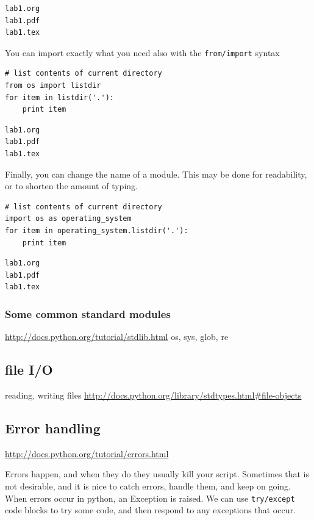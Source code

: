\documentclass[11pt]{article}
\begin{document}
\begin{verbatim}
lab1.org
lab1.pdf
lab1.tex
\end{verbatim}

You can import exactly what you need also with the \texttt{from/import} syntax
\begin{verbatim}
# list contents of current directory
from os import listdir
for item in listdir('.'):
    print item
\end{verbatim}

\begin{verbatim}
lab1.org
lab1.pdf
lab1.tex
\end{verbatim}

Finally, you can change the name of a module. This may be done for readability, or to shorten the amount of typing.
\begin{verbatim}
# list contents of current directory
import os as operating_system
for item in operating_system.listdir('.'):
    print item
\end{verbatim}

\begin{verbatim}
lab1.org
lab1.pdf
lab1.tex
\end{verbatim}

\subsubsection{Some common standard modules}
\label{sec-3-8-1}
\url{http://docs.python.org/tutorial/stdlib.html}
os, sys, glob,  re


\subsection{file I/O}
\label{sec-3-9}
reading, writing files
\url{http://docs.python.org/library/stdtypes.html#file-objects}


\subsection{Error handling}
\label{sec-3-10}
\url{http://docs.python.org/tutorial/errors.html}

Errors happen, and when they do they usually kill your script. Sometimes that is not desirable, and it is nice to catch errors, handle them, and keep on going. When errors occur in python, an Exception is raised. We can use \texttt{try/except} code blocks to try some code, and then respond to any exceptions that occur.
\end{document}
